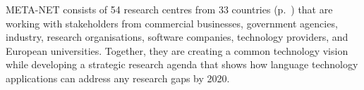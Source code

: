 \begin{Parallel}[c]{78mm}{78mm}
{META-NET consists of 54 research centres from 33 countries \cite{rehm2011} (p.~\pageref{metanetmembers}) that are working with stakeholders from commercial businesses, government agencies, industry, research organisations, software companies, technology providers, and European universities. 
Together, they are creating a common technology vision while developing a strategic research agenda that shows how language technology applications can address any research gaps by 2020.
} 
\ParallelPar
\end{Parallel}

\clearpage

\makefundingnotice



\renewcommand{\contentsname}{}
\vspace*{-5mm}
\tableofcontents



\cleardoublepage

\setcounter{page}{1}
\pagestyle{scrheadings}



